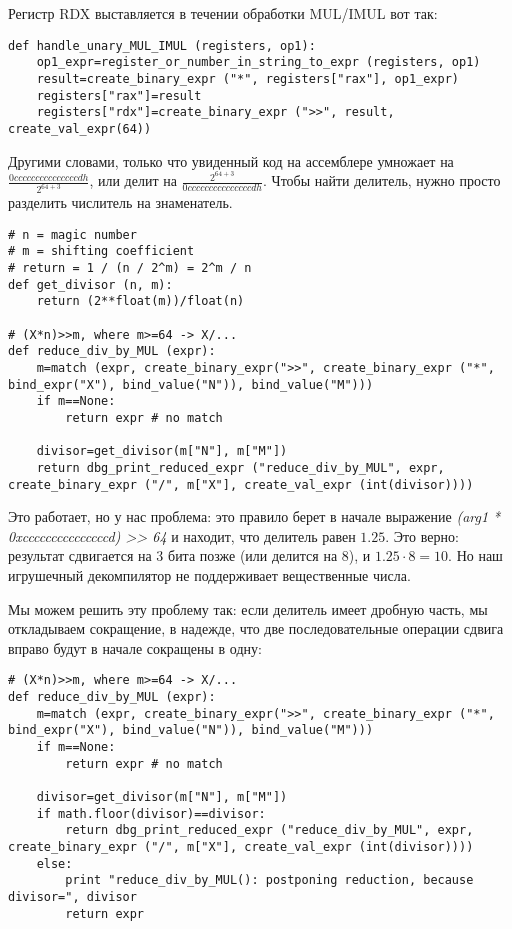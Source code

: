 Регистр RDX выставляется в течении обработки MUL/IMUL вот так:

\begin{lstlisting}
def handle_unary_MUL_IMUL (registers, op1):
    op1_expr=register_or_number_in_string_to_expr (registers, op1)
    result=create_binary_expr ("*", registers["rax"], op1_expr)
    registers["rax"]=result
    registers["rdx"]=create_binary_expr (">>", result, create_val_expr(64))
\end{lstlisting}

Другими словами, только что увиденный код на ассемблере умножает на {\Large $\frac{0cccccccccccccccdh}{2^{64+3}}$},
или делит на {\Large $\frac{2^{64+3}}{0cccccccccccccccdh}$}.
Чтобы найти делитель, нужно просто разделить числитель на знаменатель.

\begin{lstlisting}
# n = magic number
# m = shifting coefficient
# return = 1 / (n / 2^m) = 2^m / n
def get_divisor (n, m):
    return (2**float(m))/float(n)

# (X*n)>>m, where m>=64 -> X/...
def reduce_div_by_MUL (expr):
    m=match (expr, create_binary_expr(">>", create_binary_expr ("*", bind_expr("X"), bind_value("N")), bind_value("M")))
    if m==None:
        return expr # no match
    
    divisor=get_divisor(m["N"], m["M"])
    return dbg_print_reduced_expr ("reduce_div_by_MUL", expr, create_binary_expr ("/", m["X"], create_val_expr (int(divisor))))
\end{lstlisting}

Это работает, но у нас проблема: это правило берет в начале выражение \textit{(arg1 * 0xcccccccccccccccd) >> 64} и находит,
что делитель равен $1.25$.
Это верно: результат сдвигается на 3 бита позже (или делится на 8), и $1.25 \cdot 8 = 10$.
Но наш игрушечный декомпилятор не поддерживает вещественные числа.

Мы можем решить эту проблему так: если делитель имеет дробную часть, мы откладываем сокращение, в надежде,
что две последовательные операции сдвига вправо будут в начале сокращены в одну:

\begin{lstlisting}
# (X*n)>>m, where m>=64 -> X/...
def reduce_div_by_MUL (expr):
    m=match (expr, create_binary_expr(">>", create_binary_expr ("*", bind_expr("X"), bind_value("N")), bind_value("M")))
    if m==None:
        return expr # no match
    
    divisor=get_divisor(m["N"], m["M"])
    if math.floor(divisor)==divisor:
        return dbg_print_reduced_expr ("reduce_div_by_MUL", expr, create_binary_expr ("/", m["X"], create_val_expr (int(divisor))))
    else:
        print "reduce_div_by_MUL(): postponing reduction, because divisor=", divisor
        return expr
\end{lstlisting}

